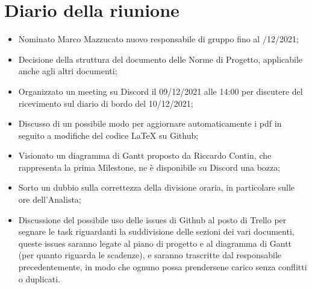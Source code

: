 \section{Diario della riunione}
\begin{itemize}
  \item Nominato Marco Mazzucato nuovo responsabile di gruppo fino al 
    /12/2021;
  \item Decisione della struttura del documento delle Norme di Progetto, applicabile anche agli altri documenti;
  \item Organizzato un meeting su Discord il 09/12/2021 alle 14:00 per discutere del ricevimento sul diario di bordo del 10/12/2021;
  \item Discusso di un possibile modo per aggiornare automaticamente i pdf in seguito a modifiche del codice LaTeX su Github;
  \item Visionato un diagramma di Gantt proposto da Riccardo Contin, che rappresenta la prima Milestone, ne è disponibile su Discord una bozza;
  \item Sorto un dubbio sulla correttezza della divisione oraria, in particolare sulle ore dell'Analista;
  \item Discussione del possibile uso delle issues di Github al posto di Trello per segnare
    le task riguardanti la suddivisione delle sezioni dei vari documenti, queste issues saranno legate
    al piano di progetto e al diagramma di Gantt (per quanto riguarda le scadenze), e saranno
    trascritte dal responsabile precedentemente, in modo che ognuno possa prendersene carico senza conflitti o duplicati.
\end{itemize}
